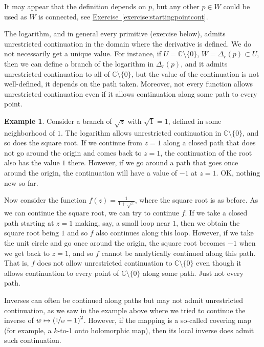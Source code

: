 \documentclass[12pt,openany]{book}
\newcommand{\C}{{\mathbb{C}}}
\theoremstyle{plain}
\theoremstyle{remark}
\theoremstyle{definition}
\theoremstyle{exercise}
\theoremstyle{example}
\newtheorem{example}[thm]{Example}
\newcommand{\exerciseref}[1]{\hyperref[#1]{Exercise~\ref*{#1}}}
\begin{document}
It may appear that the definition
depends on $p$, but any other $p \in W$ could be used as $W$ is connected,
see \exerciseref{exercise:startingpointcont}.

The logarithm, and in general every primitive (exercise below),
admits unrestricted
continuation in the domain where the derivative is defined.
We do not necessarily get a unique value.
For instance,
if $U = \C \setminus \{ 0 \}$, $W=\Delta_r(p) \subset U$, then we
can define a branch of the logarithm in $\Delta_r(p)$, and it admits
unrestricted continuation
to all of $\C \setminus \{ 0 \}$, but the value of the continuation
is not well-defined, it depends on the path taken.
Moreover,
not every function allows unrestricted continuation even if it allows
continuation along some path to every point.

\begin{example}
Consider a branch of $\sqrt{z}$ with $\sqrt{1}=1$,
defined in some neighborhood of $1$.  The logarithm allows
unrestricted continuation in $\C \setminus \{ 0 \}$, and so does the square root.
If we continue from $z=1$ along a closed path that does not go around the origin and comes
back to $z=1$, the continuation of the root also has the value $1$ there.  However,
if we go around a path that goes once around the origin, the continuation
will have a value of $-1$ at $z=1$.  OK\@, nothing new so far.

Now consider the function $f(z) = \frac{1}{1+\sqrt{z}}$, where the square
root is as before.  As we can continue the square root, we can try to
continue $f$.  If we take a closed path starting at $z=1$ making, say, a small loop
near $1$, then we obtain the square root being $1$
and so $f$ also continues along this loop.  However, if we take the
unit circle and go once around the origin, the square root becomes $-1$
when we get back to $z=1$,
and so $f$ cannot be analytically continued along this path.  That is, $f$
does not allow unrestricted continuation to $\C \setminus \{ 0 \}$ even
though it allows continuation to every point of $\C \setminus \{ 0 \}$
along some path.  Just not every path.
\end{example}

Inverses can often be continued along paths but may not
admit unrestricted continuation, as we saw in the
example above where
we tried to continue the inverse of
$w \mapsto {(\nicefrac{1}{w}-1)}^2$.
However, if the mapping is a so-called covering
map (for example, a $k$-to-1 onto holomorphic map), then its local inverse does
admit such continuation.
\end{document}
